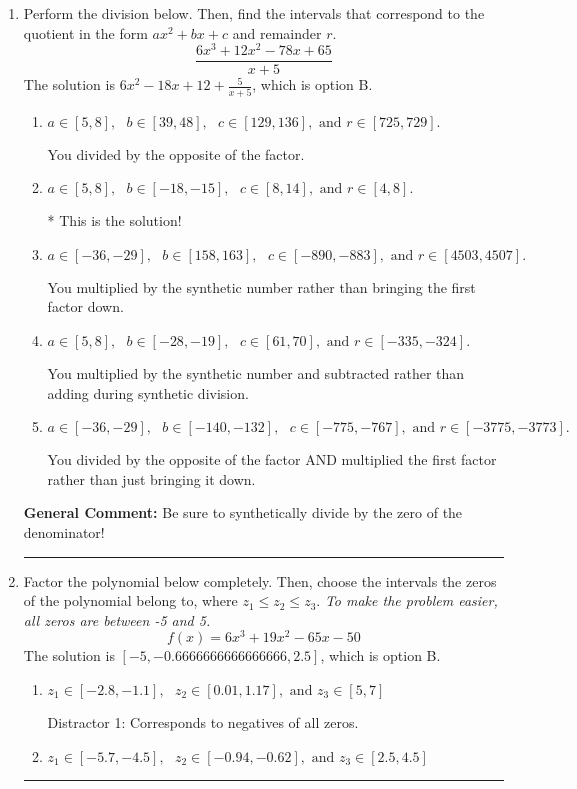 \documentclass{extbook}[14pt]
\newcommand{\litem}[1]{\item #1

\rule{\textwidth}{0.4pt}}
\begin{document}
\begin{enumerate}\litem{
Perform the division below. Then, find the intervals that correspond to the quotient in the form $ax^2+bx+c$ and remainder $r$.
\[ \frac{6x^{3} +12 x^{2} -78 x + 65}{x + 5} \]The solution is \( 6x^{2} -18 x + 12 + \frac{5}{x + 5} \), which is option B.\begin{enumerate}[label=\Alph*.]
\item \( a \in [5, 8], \text{   } b \in [39, 48], \text{   } c \in [129, 136], \text{   and   } r \in [725, 729]. \)

 You divided by the opposite of the factor.
\item \( a \in [5, 8], \text{   } b \in [-18, -15], \text{   } c \in [8, 14], \text{   and   } r \in [4, 8]. \)

* This is the solution!
\item \( a \in [-36, -29], \text{   } b \in [158, 163], \text{   } c \in [-890, -883], \text{   and   } r \in [4503, 4507]. \)

 You multiplied by the synthetic number rather than bringing the first factor down.
\item \( a \in [5, 8], \text{   } b \in [-28, -19], \text{   } c \in [61, 70], \text{   and   } r \in [-335, -324]. \)

 You multiplied by the synthetic number and subtracted rather than adding during synthetic division.
\item \( a \in [-36, -29], \text{   } b \in [-140, -132], \text{   } c \in [-775, -767], \text{   and   } r \in [-3775, -3773]. \)

 You divided by the opposite of the factor AND multiplied the first factor rather than just bringing it down.
\end{enumerate}

\textbf{General Comment:} Be sure to synthetically divide by the zero of the denominator!
}
\litem{
Factor the polynomial below completely. Then, choose the intervals the zeros of the polynomial belong to, where $z_1 \leq z_2 \leq z_3$. \textit{To make the problem easier, all zeros are between -5 and 5.}
\[ f(x) = 6x^{3} +19 x^{2} -65 x -50 \]The solution is \( [-5, -0.6666666666666666, 2.5] \), which is option B.\begin{enumerate}[label=\Alph*.]
\item \( z_1 \in [-2.8, -1.1], \text{   }  z_2 \in [0.01, 1.17], \text{   and   } z_3 \in [5, 7] \)

 Distractor 1: Corresponds to negatives of all zeros.
\item \( z_1 \in [-5.7, -4.5], \text{   }  z_2 \in [-0.94, -0.62], \text{   and   } z_3 \in [2.5, 4.5] \)


\end{enumerate}}
\end{enumerate}
\end{document}
